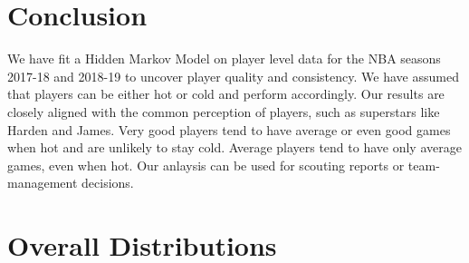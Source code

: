 \documentclass[12pt, authoryear]{elsarticle}
\begin{document}
\section{Conclusion}

We have fit a Hidden Markov Model on player level data for the NBA seasons 2017-18 and 2018-19 to uncover player quality and consistency. We have assumed that players can be either hot or cold and perform accordingly. Our results are closely aligned with the common perception of players, such as superstars like Harden and James. Very good players tend to have average or even good games when hot and are unlikely to stay cold. Average players tend to have only average games, even when hot. Our anlaysis can be used for scouting reports or team-management decisions. 



\pagebreak



\appendix

\section{Overall Distributions} \label{overall_dist}
\end{document}
